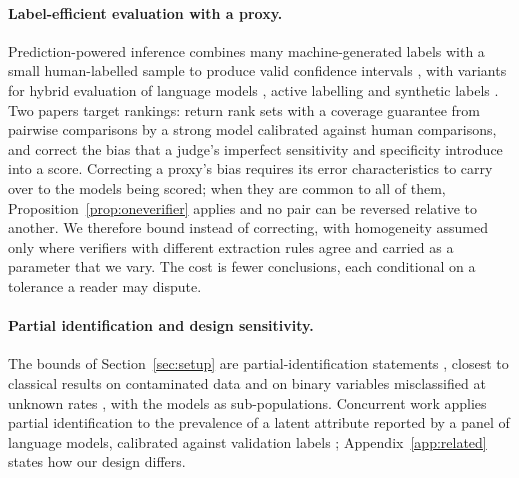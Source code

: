 \paragraph{Label-efficient evaluation with a proxy.}
Prediction-powered inference combines many machine-generated labels with a small human-labelled
sample to produce valid confidence intervals \citep{angelopoulos2023ppi}, with variants for hybrid
evaluation of language models \citep{fisch2024stratified}, active labelling
\citep{zrnic2024active} and synthetic labels \citep{boyeau2025autoeval}. Two papers target
rankings: \citet{chatzi2024ranking} return rank sets with a coverage guarantee from
pairwise comparisons by a strong model calibrated against human comparisons, and
\citet{lee2026judge} correct the bias that a judge's imperfect sensitivity and specificity
introduce into a score. Correcting a proxy's bias requires its error characteristics to carry over
to the models being scored; when they are common to all of them,
Proposition~\ref{prop:oneverifier} applies and no pair can be reversed relative to another. We
therefore bound instead of correcting, with homogeneity assumed only where verifiers with different
extraction rules agree and carried as a parameter that we vary. The cost is fewer conclusions,
each conditional on a tolerance a reader may dispute.

\paragraph{Partial identification and design sensitivity.}
The bounds of Section~\ref{sec:setup} are partial-identification statements
\citep{manski2003partial}, closest to classical results on contaminated data
\citep{horowitz1995identification} and on binary variables misclassified at unknown rates
\citep{molinari2008partial}, with the models as sub-populations. Concurrent
work applies partial identification to the prevalence of a latent attribute reported by a panel of
language models, calibrated against validation labels \citep{chen2026partial}; Appendix~\ref{app:related}
states how our design differs.
